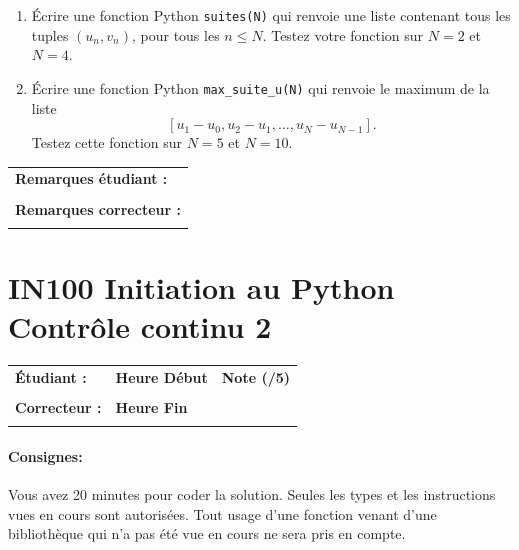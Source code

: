 \documentclass[a4paper,11pt]{article}
\begin{document}
\begin{enumerate}
 \item Écrire une fonction Python \texttt{suites(N)} qui renvoie une liste contenant tous les tuples  $(u_n,v_n)$, pour tous les $n\leq N$.  Testez votre fonction sur $N=2$ et $N=4$. 
 \item Écrire une fonction Python \texttt{max\_suite\_u(N)} qui renvoie le maximum de la liste 
 $$[u_1-u_0,u_2-u_1, \ldots , u_N-u_{N-1}].$$ 
 Testez cette fonction sur $N=5$ et $N=10$. 
 \end{enumerate}


\vspace{0.5 cm}
\begin{table}[h!]
\centering
\renewcommand{\arraystretch}{1.4} %
\begin{tabular}{|p{15cm}|}
\hline
\textbf{Remarques étudiant :}    \\
 \\
\hline
\textbf{Remarques correcteur :}  \\
 \\
\hline
\end{tabular}
\end{table}


\newpage

\section*{\center IN100 Initiation au Python\\
Contrôle continu 2}

\vspace{-0.3 cm}

\begin{table}[h!]
\centering
\renewcommand{\arraystretch}{1.4} %
\begin{tabular}{|p{10cm}|p{3cm}|p{2cm}|}
\hline
\textbf{Étudiant :} & \textbf{Heure Début }  & \textbf{Note (/5) }  \\
& & \\
\hline
\textbf{Correcteur :} & \textbf{Heure Fin } & \\
& & \\
\hline

\hline
\end{tabular}
\end{table}

\vspace{0.4 cm}
\paragraph*{Consignes:} Vous avez 20 minutes pour coder la solution. Seules les types et les instructions vues en cours sont autorisées. Tout usage d'une fonction 
venant d'une bibliothèque qui n'a pas été vue en cours ne sera pris en compte. 
\vspace{0.4 cm}
\end{document}
